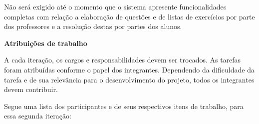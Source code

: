 \documentclass[12pt,letterpaper]{article}
\begin{document}
Não será exigido até o momento que o sistema apresente funcionalidades 
completas com relação a elaboração de questões e de listas de exercícios por 
parte dos professores e a resolução destas por partes dos alunos.





\vspace{1cm}
{\large {\bf Atribuições de trabalho}}
\vspace{0.5cm}

A cada iteração, os cargos e responsabilidades devem ser trocados. As tarefas foram atribuídas conforme o papel dos integrantes. Dependendo da dificuldade da tarefa e de sua relevância para o desenvolvimento do projeto, todos os integrantes devem contribuir.

Segue uma lista dos participantes e de seus respectivos itens de trabalho, para essa segunda iteração: 
\end{document}
